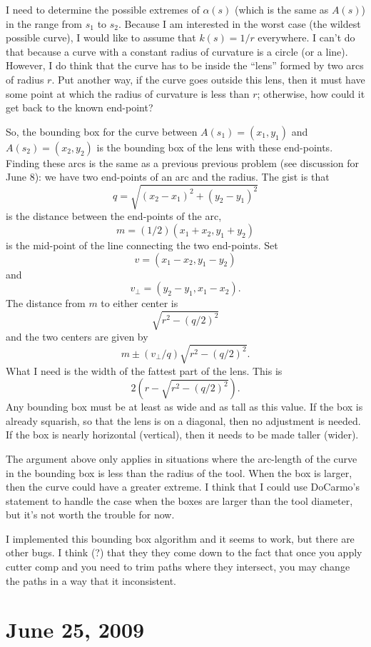 \documentclass[titlepage,oneside,10pt]{article}
\begin{document}
I need to determine the possible extremes of $\alpha(s)$ (which is the
same as $A(s)$) in the range from $s_1$ to $s_2$. Because I am
interested in the worst case (the wildest possible curve), I would
like to assume that $k(s)=1/r$ everywhere. I can't do that because a
curve with a constant radius of curvature is a circle (or a
line). However, I do think that the curve has to be inside the
``lens'' formed by two arcs of radius $r$. Put another way, if the
curve goes outside this lens, then it must have some point at which
the radius of curvature is less than $r$; otherwise, how could it get
back to the known end-point?

So, the bounding box for the curve between $A(s_1)=(x_1,y_1)$ and
$A(s_2)=(x_2,y_2)$ is the bounding box of the lens with these
end-points. Finding these arcs is the same as a previous previous
problem (see discussion for June 8): we have two end-points of an arc
and the radius. The gist is that
$$q = \sqrt{(x_2-x_1)^2+(y_2-y_1)^2}$$
is the distance between the end-points of the arc,
$$m = (1/2)(x_1+x_2,y_1+y_2)$$
is the mid-point of the line connecting the two end-points. Set
$$v = (x_1-x_2,y_1-y_2)$$
and
$$v_{\perp} = (y_2-y_1,x_1-x_2).$$
The distance from $m$ to either center is
$$\sqrt{r^2-(q/2)^2}$$
and the two centers are given by
$$m\pm (v_\perp/q)\sqrt{r^2-(q/2)^2}.$$
What I need is the width of the fattest part of the lens. This is
$$2\left(r - \sqrt{r^2-(q/2)^2}\right).$$
Any bounding box must be at least as wide and as tall as this
value. If the box is already squarish, so that the lens is on a
diagonal, then no adjustment is needed. If the box is nearly
horizontal (vertical), then it needs to be made taller (wider).

The argument above only applies in situations where the arc-length of
the curve in the bounding box is less than the radius of the
tool. When the box is larger, then the curve could have a greater
extreme. I think that I could use DoCarmo's statement to handle the
case when the boxes are larger than the tool diameter, but it's not
worth the trouble for now.

I implemented this bounding box algorithm and it seems to work, but
there are other bugs. I think (?) that they they come down to the fact
that once you apply cutter comp and you need to trim paths where they
intersect, you may change the paths in a way that it inconsistent.

\section{June 25, 2009}
\end{document}

